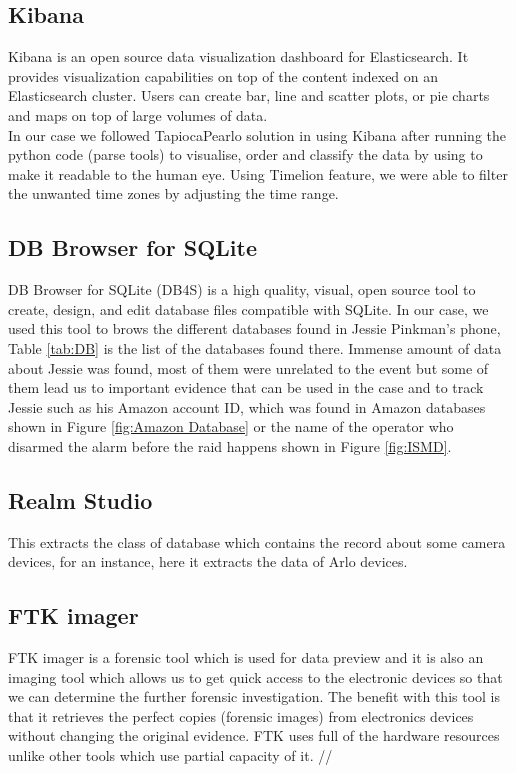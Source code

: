 \documentclass{easychair}
\begin{document}
\subsection{Kibana}
Kibana is an open source data visualization dashboard for Elasticsearch. It provides visualization capabilities on top of the content indexed on an Elasticsearch cluster. Users can create bar, line and scatter plots, or pie charts and maps on top of large volumes of data. \cite{Ali_4} \cite{Ali_5} \\ In our case we followed TapiocaPearlo solution in using Kibana after running the python code (parse tools) to visualise, order and classify the data by using to make it readable to the human eye. Using Timelion feature, we were able to filter the unwanted time zones by adjusting the time range.



\subsection{DB Browser for SQLite}
DB Browser for SQLite (DB4S) is a high quality, visual, open source tool to create, design, and edit database files compatible with SQLite. In our case, we used this tool to brows the different databases found in Jessie Pinkman's phone,  Table \ref{tab:DB} is the list of the databases found there. Immense amount of data about Jessie was found, most of them were unrelated to the event but some of them lead us to important evidence that can be used in the case and to track Jessie such as his Amazon account ID, which was found in Amazon databases shown in Figure \ref{fig:Amazon Database} or the name of the operator who disarmed the alarm before the raid happens shown in Figure \ref{fig:ISMD}.

\subsection{Realm Studio}
This extracts the class of database which contains the record about some camera devices, for an instance, here it extracts the data of Arlo devices.\\

\subsection{FTK imager}
FTK imager is a forensic tool which is used for data preview and it is also an imaging tool which allows us to get quick access to the electronic devices so that we can determine the further forensic investigation. The benefit with this tool is that it retrieves the perfect copies (forensic images) from electronics devices without changing the original evidence. FTK uses full of the hardware resources unlike other tools which use partial capacity of it. //  
	
\end{document}
